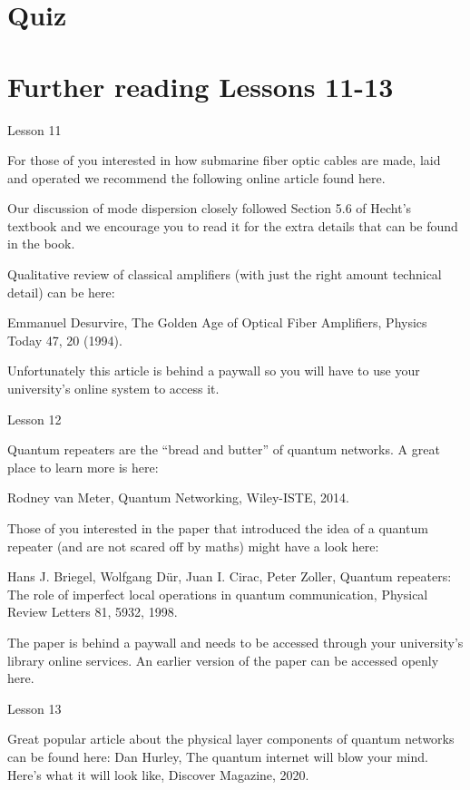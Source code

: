 \newpage
\section{Quiz}


\section{Further reading Lessons 11-13}

Lesson 11

For those of you interested in how submarine fiber optic cables are made, laid and operated we recommend the following online article found here.

Our discussion of mode dispersion closely followed Section 5.6 of Hecht’s textbook and we encourage you to read it for the extra details that can be found in the book.

Qualitative review of classical amplifiers (with just the right amount technical detail) can be here:

Emmanuel Desurvire, The Golden Age of Optical Fiber Amplifiers, Physics Today 47, 20 (1994).

Unfortunately this article is behind a paywall so you will have to use your university’s online system to access it.

Lesson 12

Quantum repeaters are the “bread and butter” of quantum networks. A great place to learn more is here:

Rodney van Meter, Quantum Networking, Wiley-ISTE, 2014.

Those of you interested in the paper that introduced the idea of a quantum repeater (and are not scared off by maths) might have a look here:

Hans J. Briegel, Wolfgang Dür, Juan I. Cirac, Peter Zoller, Quantum repeaters: The role of imperfect local operations in quantum communication, Physical Review Letters 81, 5932, 1998.

The paper is behind a paywall and needs to be accessed through your university’s library online services. An earlier version of the paper can be accessed openly here.

Lesson 13

Great popular article about the physical layer components of quantum networks can be found here:
Dan Hurley, The quantum internet will blow your mind. Here’s what it will look like, Discover Magazine, 2020.

